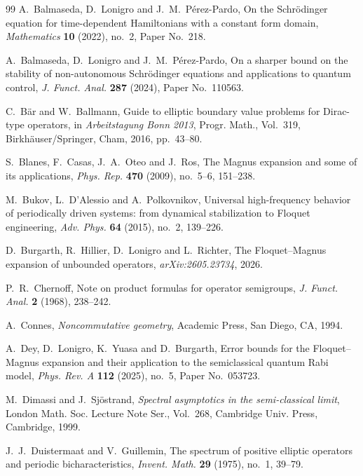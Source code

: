\documentclass[11pt]{amsart}
\theoremstyle{plain}
\theoremstyle{definition}
\theoremstyle{remark}
\begin{document}
\begin{thebibliography}{99}
A.~Balmaseda, D.~Lonigro and J.~M.~P\'erez-Pardo,
On the Schr\"odinger equation for time-dependent Hamiltonians with a
constant form domain,
\emph{Mathematics} \textbf{10} (2022), no.~2, Paper No.~218.

A.~Balmaseda, D.~Lonigro and J.~M.~P\'erez-Pardo,
On a sharper bound on the stability of non-autonomous Schr\"odinger equations
and applications to quantum control,
\emph{J. Funct. Anal.} \textbf{287} (2024), Paper No.~110563.

C.~B\"ar and W.~Ballmann,
Guide to elliptic boundary value problems for Dirac-type operators,
in \emph{Arbeitstagung Bonn 2013},
Progr. Math., Vol.~319,
Birkh\"auser/Springer, Cham, 2016, pp.~43--80.

S.~Blanes, F.~Casas, J.~A.~Oteo and J.~Ros,
The Magnus expansion and some of its applications,
\emph{Phys. Rep.} \textbf{470} (2009), no.~5--6, 151--238.

M.~Bukov, L.~D'Alessio and A.~Polkovnikov,
Universal high-frequency behavior of periodically driven systems:
from dynamical stabilization to Floquet engineering,
\emph{Adv. Phys.} \textbf{64} (2015), no.~2, 139--226.

D.~Burgarth, R.~Hillier, D.~Lonigro and L.~Richter,
The Floquet--Magnus expansion of unbounded operators,
\emph{arXiv:2605.23734}, 2026.

P.~R.~Chernoff,
Note on product formulas for operator semigroups,
\emph{J. Funct. Anal.} \textbf{2} (1968), 238--242.

A.~Connes,
\emph{Noncommutative geometry},
Academic Press, San Diego, CA, 1994.

A.~Dey, D.~Lonigro, K.~Yuasa and D.~Burgarth,
Error bounds for the Floquet--Magnus expansion and their application to the
semiclassical quantum Rabi model,
\emph{Phys. Rev. A} \textbf{112} (2025), no.~5, Paper No.~053723.

M.~Dimassi and J.~Sj\"ostrand,
\emph{Spectral asymptotics in the semi-classical limit},
London Math. Soc. Lecture Note Ser., Vol.~268,
Cambridge Univ. Press, Cambridge, 1999.

J.~J.~Duistermaat and V.~Guillemin,
The spectrum of positive elliptic operators and periodic bicharacteristics,
\emph{Invent. Math.} \textbf{29} (1975), no.~1, 39--79.


\end{thebibliography}
\end{document}
